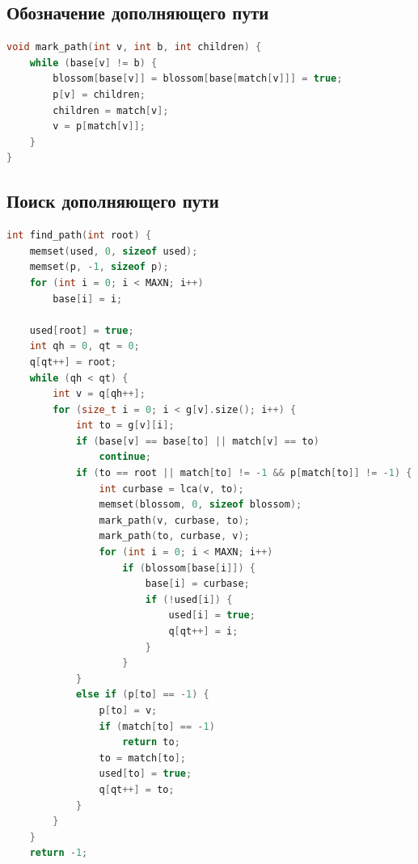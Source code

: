 \documentclass[14pt, a4paper]{extarticle}
\begin{document}
    \subsection*{Обозначение дополняющего пути}
    \begin{lstlisting}[language=c++]
void mark_path(int v, int b, int children) {
    while (base[v] != b) {
        blossom[base[v]] = blossom[base[match[v]]] = true;
        p[v] = children;
        children = match[v];
        v = p[match[v]];
    }
} 
    \end{lstlisting}

    \pagebreak

    \subsection*{Поиск дополняющего пути}

    \begin{lstlisting}[language=c++]
int find_path(int root) {
    memset(used, 0, sizeof used);
    memset(p, -1, sizeof p);
    for (int i = 0; i < MAXN; i++)
        base[i] = i;
    
    used[root] = true;
    int qh = 0, qt = 0;
    q[qt++] = root;
    while (qh < qt) {
        int v = q[qh++];
        for (size_t i = 0; i < g[v].size(); i++) {
            int to = g[v][i];
            if (base[v] == base[to] || match[v] == to)  
                continue;
            if (to == root || match[to] != -1 && p[match[to]] != -1) {
                int curbase = lca(v, to);
                memset(blossom, 0, sizeof blossom);
                mark_path(v, curbase, to);
                mark_path(to, curbase, v);
                for (int i = 0; i < MAXN; i++)
                    if (blossom[base[i]]) {
                        base[i] = curbase;
                        if (!used[i]) {
                            used[i] = true;
                            q[qt++] = i;
                        }
                    }
            }
            else if (p[to] == -1) {
                p[to] = v;
                if (match[to] == -1)
                    return to;
                to = match[to];
                used[to] = true;
                q[qt++] = to;
            }
        }
    }
    return -1;
    \end{lstlisting}


\end{document}

